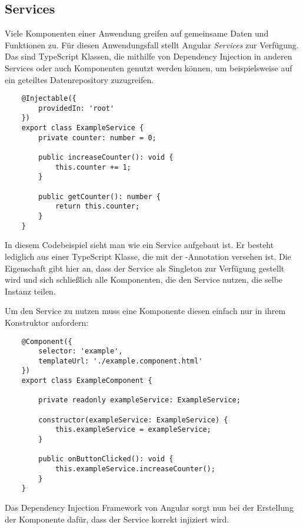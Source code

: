 \subsection{Services}

Viele Komponenten einer Anwendung greifen auf gemeinsame Daten und Funktionen zu. Für diesen Anwendungsfall stellt Angular \textit{Services} zur Verfügung. Das sind TypeScript Klassen, die mithilfe von Dependency Injection in anderen Services oder auch Komponenten genutzt werden können, um beispielsweise auf ein geteiltes Datenrepository zuzugreifen.

\begin{verbatim}
    @Injectable({
        providedIn: 'root'
    })
    export class ExampleService {
        private counter: number = 0;
        
        public increaseCounter(): void {
            this.counter += 1;
        }

        public getCounter(): number {
            return this.counter;
        }
    }
\end{verbatim}

In diesem Codebeispiel sieht man wie ein Service aufgebaut ist. Er besteht lediglich aus einer TypeScript Klasse, die mit der -Annotation versehen ist. Die Eigenschaft  gibt hier an, dass der Service als Singleton zur Verfügung gestellt wird und sich schließlich alle Komponenten, die den Service nutzen, die selbe Instanz teilen.

Um den Service zu nutzen muss eine Komponente diesen einfach nur in ihrem Konstruktor anfordern:

\begin{verbatim}
    @Component({
        selector: 'example',
        templateUrl: './example.component.html'
    })
    export class ExampleComponent {

        private readonly exampleService: ExampleService;

        constructor(exampleService: ExampleService) {
            this.exampleService = exampleService;
        }

        public onButtonClicked(): void {
            this.exampleService.increaseCounter();
        }
    }
\end{verbatim}

Das Dependency Injection Framework von Angular sorgt nun bei der Erstellung der Komponente dafür, dass der Service korrekt injiziert wird.